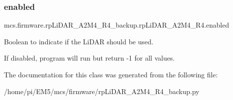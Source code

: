 \subsubsection{\texorpdfstring{enabled}{enabled}}
{\footnotesize\ttfamily mcs.\+firmware.\+rp\+Li\+D\+A\+R\+\_\+\+A2\+M4\+\_\+\+R4\+\_\+backup.\+rp\+Li\+D\+A\+R\+\_\+\+A2\+M4\+\_\+\+R4.\+enabled}



Boolean to indicate if the Li\+D\+AR should be used. 

If disabled, program will run but return -\/1 for all values. 

The documentation for this class was generated from the following file\+:\begin{DoxyCompactItemize}
\item 
/home/pi/\+E\+M5/mcs/firmware/rp\+Li\+D\+A\+R\+\_\+\+A2\+M4\+\_\+\+R4\+\_\+backup.\+py\end{DoxyCompactItemize}
